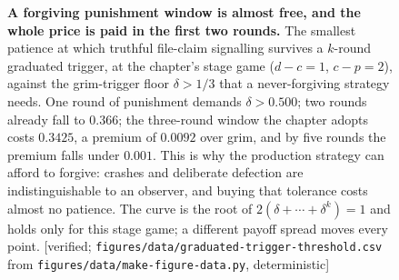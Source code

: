 \begin{figure}[H]
\vspace{2mm}
\caption{\textbf{A forgiving punishment window is almost free, and the whole
price is paid in the first two rounds.} The smallest patience at which
truthful file-claim signalling survives a $k$-round
graduated trigger, at the chapter's stage game ($d-c=1$, $c-p=2$), against the
grim-trigger floor $\delta>1/3$ that a never-forgiving strategy needs. One
round of punishment demands $\delta>0.500$; two rounds already fall to $0.366$;
the three-round window the chapter adopts costs $0.3425$, a premium of
$0.0092$ over grim, and by five rounds the premium falls under $0.001$. This is why the
production strategy can afford to forgive: crashes and deliberate defection are
indistinguishable to an observer, and buying that tolerance costs almost no
patience. The curve is the root of $2(\delta+\cdots+\delta^k)=1$ and holds only
for this stage game; a different payoff spread moves every point.
[verified; \texttt{figures/data/graduated-trigger-threshold.csv} from
\texttt{figures/data/make-figure-data.py}, deterministic]}
\label{fig:bc-graduated-trigger}
\end{figure}
